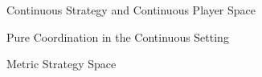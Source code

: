 \documentclass{beamer}
\begin{document}
\begin{frame}{Continuous Strategy and Continuous Player Space}
\end{frame}

\begin{frame}{Pure Coordination in the Continuous Setting}
\end{frame}

\begin{frame}{Metric Strategy Space}
\end{frame}
\end{document}
